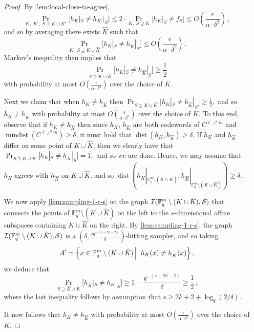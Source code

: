 \documentclass[11pt]{article}
\numberwithin{equation}{section}
\newtheorem{lemma}[theorem]{Lemma}
\theoremstyle{definition}
\theoremstyle{plain}
\theoremstyle{plain}
\DeclareMathOperator{\dist}{dist} %
\DeclareMathOperator{\mindist}{mindist}  %
\newcommand{\F}{{\mathbb{F}}}
\newcommand{\calI}{{\mathcal{I}}}
\newcommand\sett[2]{\left\{ #1 \left| \; \vphantom{#1 #2} \right. #2  \right\}}
\begin{document}

\begin{proof}
By \cref{lem:local-close-to-agree},
\[
\Pr_{K, \; K',\; S \supseteq K \cup K'}\big[h_K|_S \neq h_{K'}|_S\big] \leq 2\cdot \Pr_{K, \; S \supseteq K}\big[h_K|_S \neq f_S\big] \leq O\left(\frac{\epsilon} {\alpha \cdot \delta^2}\right)\,,
\]
and so by averaging there exists $\hat K$ such that
\[
\Pr_{K, \; S \supseteq  K \cup \hat K}\big[h_{ K}|_S \neq h_{\hat K}|_S\big] \leq  O\left(\frac{\epsilon} {\alpha \cdot \delta^2}\right)\,.
\]
Markov's inequality then implies that
\[\Pr_{S \supseteq K \cup \hat K}\big[h_{ K}|_S \neq h_{ \hat K}|_S\big]  \geq \frac{1} {2}\]
with probability at most $O\left(\frac{\epsilon} {\alpha \cdot \delta^2}\right)$ over the choice of $K$.

%
Next we claim that when $h_{K} \neq h_{\hat K} $ then $\Pr_{S \supseteq K \cup \hat K}\big[h_{ K}|_S \neq h_{ \hat K}|_S\big]  \geq \frac{1} {2},$ and so $h_{K} \neq h_{\hat K}$ with probability at most $O\left(\frac{\epsilon} {\alpha \cdot \delta^2}\right)$ over the choice of $K$. To this end, observe that if $h_{K} \neq h_{\hat K} $ then since $h_{ K}$, $h_{ \hat K}$ are both codewords of $C^{\ell \nearrow m}$ and $\mindist(C^{\ell \nearrow m}) \geq \delta$, it must hold that $\dist(h_{ K}, h_{\hat K}) \geq \delta$. If $h_K$ and $h_{\hat K}$ differ on some point of $K \cup \hat K$, then we clearly have that $\Pr_{S \supseteq K \cup \hat K}\big[h_{ K}|_S \neq h_{ \hat K}|_S\big]  =1,$ and so we are done. Hence, we may assume that $h_K$ agrees with $h_{\hat K}$ on $K \cup \hat K$, and so $\dist \left(h_{ K}|_{ \F_q^m \setminus (K \cup \hat K)}, h_{\hat K}| _{  \F_q^m \setminus (K \cup \hat K)  } \right)\geq \delta$.

We now apply \cref{lem:sampling-1-r-s} on the graph $\calI ( \F_q^m \setminus (K \cup \hat K),\cal S )$ that connects the points of $\F_q^m\setminus (K \cup \hat K)$ on the left to the $s$-dimensional affine subspaces containing $K \cup \hat K$ on the right. By \cref{lem:sampling-1-r-s}, the graph $\calI ( \F_q^m \setminus (K \cup \hat K),\cal S )$ is a $(\delta, \frac{4q^{-(s-2k-2)} } {\delta})$-hitting sampler, and so taking
%
\[
A'=\sett{x\in \F_q^m \setminus (K \cup \hat K)}{h_{ K}(x)\neq h_{\hat K}(x)},
\]
we deduce that
\[
\Pr_{S \supseteq \hat K \cup K}\big[h_{\hat K}|_S \neq h_{K}|_S\big] \geq 1- \frac{ q^{-(s-2k-2)}} {\delta} \geq \frac12\,,
\]
where the last inequality follows by assumption that $s \geq 2k +2+\log_q(2/\delta)$.

%
%
%
%
%

It now follows that $h_{K} \neq h_{\hat K}$ with probability at most $O\left(\frac{\epsilon} {\alpha \cdot \delta^2}\right)$ over the choice of $K$.
\end{proof}
\end{document}
